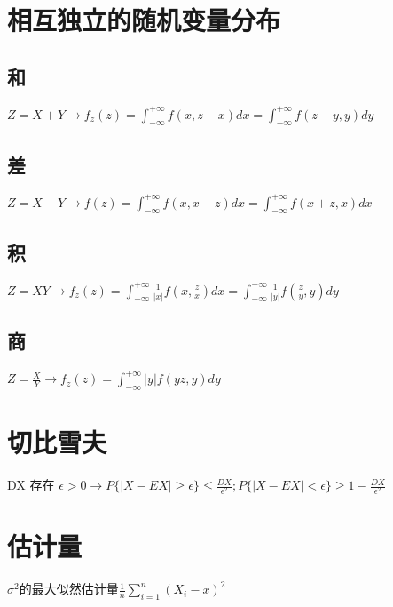 \documentclass[UTF8]{ctexart}
\begin{document}
\section{相互独立的随机变量分布}
\subsection{和}
$Z=X+Y \longrightarrow f_z(z)=\int_{-\infty}^{+\infty}f(x,z-x)dx=\int_{-\infty}^{+\infty}f(z-y,y)dy$ \\
\subsection{差}
$Z=X-Y \longrightarrow f(z)=\int_{-\infty}^{+\infty}f(x,x-z)dx=\int_{-\infty}^{+\infty}f(x+z,x)dx$
\subsection{积}
$Z=XY \longrightarrow f_z(z) = \int_{-\infty}^{+\infty}
\frac{1}{|x|}
f(x,\frac{z}{x})
dx=
\int_{-\infty}^{+\infty}
\frac{1}{|y|}
f(\frac{z}{y},{y})
dy
$
\subsection{商}
$Z=\frac{X}{Y} \longrightarrow
f_z(z)=
\int_{-\infty}^{+\infty}
|y|
f(yz,y)
dy
$
\section{切比雪夫}
DX 存在
$\epsilon>0
\rightarrow P\{|X-EX|\geq \epsilon\}\leq\frac{DX}{\epsilon^2} ;
P\{|X-EX|< \epsilon\}\geq1-\frac{DX}{\epsilon^2}$
\section{估计量}
$\sigma^2$的最大似然估计量$\frac{1}{n}
\sum_{i=1}^n
{(X_i - \bar{x})}^2$
\end{document}
